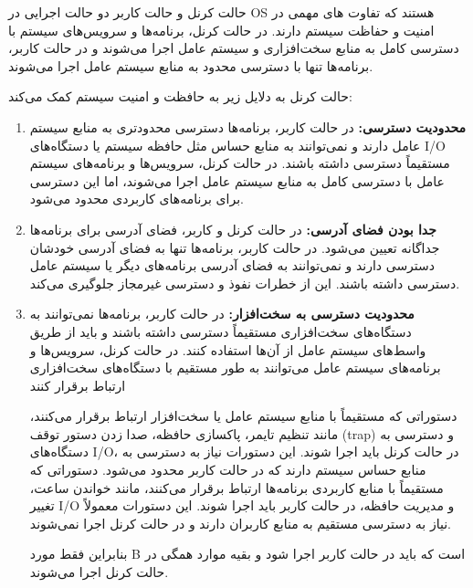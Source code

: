 \begin{qsolve}
حالت کرنل و حالت کاربر دو حالت اجرایی در OS هستند که تفاوت های مهمی در امنیت و حفاظت سیستم دارند. در حالت کرنل، برنامه‌ها و سرویس‌های سیستم با دسترسی کامل به منابع سخت‌افزاری و سیستم عامل اجرا می‌شوند و در حالت کاربر، برنامه‌ها تنها با دسترسی محدود به منابع سیستم عامل اجرا می‌شوند.

حالت کرنل به دلایل زیر به حافظت و امنیت سیستم کمک می‌کند:
\begin{enumerate}
	\item \textbf{محدودیت دسترسی:‌ }در حالت کاربر، برنامه‌ها دسترسی محدودتری به منابع سیستم عامل دارند و نمی‌توانند به منابع حساس مثل حافظه سیستم یا دستگاه‌های I/O مستقیماً دسترسی داشته باشند. در حالت کرنل، سرویس‌ها و برنامه‌های سیستم عامل با دسترسی کامل به منابع سیستم عامل اجرا می‌شوند، اما این دسترسی برای برنامه‌های کاربردی محدود می‌شود.
	
	\item \textbf{جدا بودن فضای آدرسی: }در حالت کرنل و کاربر، فضای آدرسی برای برنامه‌ها جداگانه تعیین می‌شود. در حالت کاربر، برنامه‌ها تنها به فضای آدرسی خودشان دسترسی دارند و نمی‌توانند به فضای آدرسی برنامه‌های دیگر یا سیستم عامل دسترسی داشته باشند. این از خطرات نفوذ و دسترسی غیرمجاز جلوگیری می‌کند.
	
	
	\item \textbf{محدودیت دسترسی به سخت‌افزار: }در حالت کاربر، برنامه‌ها نمی‌توانند به دستگاه‌های سخت‌افزاری مستقیماً دسترسی داشته باشند و باید از طریق واسط‌های سیستم عامل از آن‌ها استفاده کنند. در حالت کرنل، سرویس‌ها و برنامه‌های سیستم عامل می‌توانند به طور مستقیم با دستگاه‌های سخت‌افزاری ارتباط برقرار کنند
	
	دستوراتی که مستقیماً با منابع سیستم عامل یا سخت‌افزار ارتباط برقرار می‌کنند، مانند تنظیم تایمر، پاکسازی حافظه، صدا زدن دستور توقف (trap) و دسترسی به دستگاه‌های I/O، در حالت کرنل باید اجرا شوند. این دستورات نیاز به دسترسی به منابع حساس سیستم دارند که در حالت کاربر محدود می‌شود. دستوراتی که مستقیماً با منابع کاربردی برنامه‌ها ارتباط برقرار می‌کنند، مانند خواندن ساعت، تغییر I/O و مدیریت حافظه، در حالت کاربر باید اجرا شوند. این دستورات معمولاً نیاز به دسترسی مستقیم به منابع کاربران دارند و در حالت کرنل اجرا نمی‌شوند.
	
	بنابراین فقط مورد B است که باید در حالت کاربر اجرا شود و بقیه موارد همگی در حالت کرنل اجرا می‌شوند.
\end{enumerate}
\end{qsolve}








